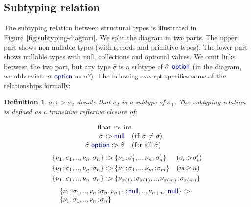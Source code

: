\documentclass[preprint]{sigplanconf}
\newcommand{\kvd}[1]{\textnormal{\textcolor{kvdclr}{\sffamily #1}}}
\newcommand{\ident}[1]{\textnormal{\sffamily #1}}
\newtheorem{definition}{Definition}
\begin{document}

\subsection{Subtyping relation}
\label{sec:inference-subtyping}

The subtyping relation between structural types is illustrated in Figure~\ref{fig:subtyping-diagram}.
We split the diagram in two parts. The upper part shows non-nullable types (with records and
primitive types). The lower part shows nullable types with \kvd{null}, collections and optional
values. We omit links between the two part, but any type $\hat{\sigma}$ is a subtype of
$\hat{\sigma}~\kvd{option}$ (in the diagram, we abbreviate $\sigma~\kvd{option}$ as $\sigma?$).
The following excerpt specifies some of the relationships formally:

\begin{definition}
$\sigma_1 :> \sigma_2$ denote that $\sigma_2$ is a subtype of $\sigma_1$. The
subtyping relation is defined as a transitive reflexive closure of:

\begin{align}
\ident{float}\,:>\,\ident{int}\\[-0.2em]
\sigma :> \kvd{null} \quad &(\textnormal{iff}~\sigma \neq \hat{\sigma}) \\[-0.2em]
\hat{\sigma}~\kvd{option} :> \hat{\sigma} \quad &(\textnormal{for all}~\hat{\sigma})
\end{align}
\begin{align}
 \{ \nu_1\!:\!\sigma_1, .., \nu_n\!:\!\sigma_n \} &:>  \{ \nu_1\!:\!\sigma_1', .., \nu_n\!:\!\sigma_n' \}
   \;\,\quad (\sigma_i \hspace{-0.25em}:>\hspace{-0.25em} \sigma_i') \\
 \{ \nu_1\!:\!\sigma_1, .., \nu_n\!:\!\sigma_n \} &:>  \{ \nu_1\!:\!\sigma_1, .., \nu_m\!:\!\sigma_m \}
   \quad (m \hspace{-0.1em}\geq\hspace{-0.1em} n) \\
 \{ \nu_1\!:\!\sigma_1, .., \nu_n\!:\!\sigma_n \} &:> \{ \nu_{\pi(1)}\!:\!\sigma_{\pi(1)}, .., \nu_{\pi(m)}\!:\!\sigma_{\pi(m)} \}
\end{align}
\vspace{-1.5em}
\begin{align}
\hspace{-0.6em}
\begin{array}{l}
 \{ \nu_1\!:\!\sigma_1, .., \nu_n\!:\!\sigma_n, \nu_{n+1}\!:\!\kvd{null}, .., \nu_{n+m}\!:\!\kvd{null} \} :> \\
 \{ \nu_1\!:\!\sigma_1, .., \nu_n\!:\!\sigma_n \}
\end{array}
\end{align}
\end{definition}
\end{document}
